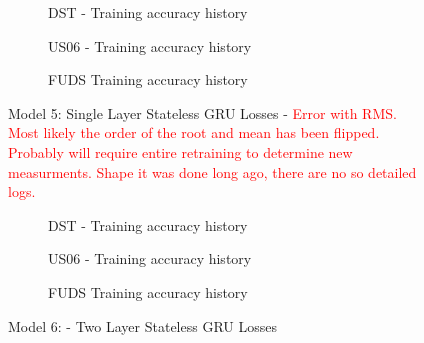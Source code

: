 \begin{figure}[htbp]
    \centering
    \begin{subfigure}[b]{0.95\textwidth}
        \centering
        
        \caption{DST - Training accuracy history}
    \end{subfigure}
    \hfill
    \begin{subfigure}[b]{0.95\textwidth}
        \centering
        
        \caption{US06 - Training accuracy history}
    \end{subfigure}
    \hfill
    \begin{subfigure}[b]{0.95\textwidth}
        \centering
        
        \caption{FUDS Training accuracy history}
    \end{subfigure}    
    \caption{Model 5: Single Layer Stateless GRU Losses -  \textcolor{red}{Error with RMS. Most likely the order of the root and mean has been flipped. Probably will require entire retraining to determine new measurments. Shape it was done long ago, there are no so detailed logs.}}
    \label{fig:Model-5losses}
\end{figure}
\begin{figure}[htbp]
    \centering
    \begin{subfigure}[b]{0.95\textwidth}
        \centering
        
        \caption{DST - Training accuracy history}
    \end{subfigure}
    \hfill
    \begin{subfigure}[b]{0.95\textwidth}
        \centering
        
        \caption{US06 - Training accuracy history}
    \end{subfigure}
    \hfill
    \begin{subfigure}[b]{0.95\textwidth}
        \centering
        
        \caption{FUDS Training accuracy history}
    \end{subfigure}    
    \caption{Model 6: - Two Layer Stateless GRU Losses}
    \label{fig:Model-6losses}
\end{figure}

